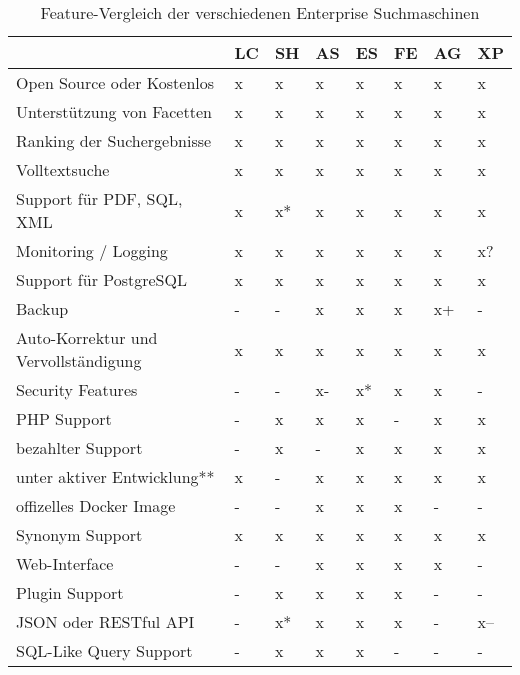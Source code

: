 \begin{table} %
	\centering
		\begin{tabular}{l | l | l | l | l | l | l | l}
		& \textbf{LC} & \textbf{SH} & \textbf{AS} & \textbf{ES}  & \textbf{FE} & \textbf{AG} & \textbf{XP} \\
        \hline
        Open Source oder Kostenlos                  & x & x  & x & x  & x & x  & x  \\
        Unterstützung von Facetten                  & x & x  & x & x  & x & x  & x  \\
        Ranking der Suchergebnisse                  & x & x  & x & x  & x & x  & x  \\
        Volltextsuche                               & x & x  & x & x  & x & x  & x  \\
        Support für PDF, SQL, XML                   & x & x* & x & x  & x & x  & x  \\
        Monitoring / Logging                        & x & x  & x & x  & x & x  & x? \\
        \hline
        Support für PostgreSQL                      & x & x  & x  & x  & x & x  & x \\
        Backup                                      & - & -  & x  & x  & x & x+ & - \\
        Auto-Korrektur und Vervollständigung        & x & x  & x  & x  & x & x  & x \\
        Security Features                           & - & -  & x- & x* & x & x  & - \\
        PHP Support                                 & - & x  & x  & x  & - & x  & x \\
        bezahlter Support                           & - & x  & -  & x  & x & x  & x \\
        \hline
        unter aktiver Entwicklung**                 & x & -  & x  & x  & x & x  & x \\
        offizelles Docker Image                     & - & -  & x  & x  & x & -  & - \\
        Synonym Support                             & x & x  & x  & x  & x & x  & x \\
        Web-Interface                               & - & -  & x  & x  & x & x  & - \\
        Plugin Support                              & - & x  & x  & x  & x & -  & - \\
        JSON oder RESTful API                       & - & x* & x  & x  & x & -  & x-- \\
        SQL-Like Query Support                      & - & x  & x  & x  & - & -  & - \\
		\end{tabular}
    \caption{Feature-Vergleich der verschiedenen Enterprise Suchmaschinen }
    \label{vglTable}


\end{table}
